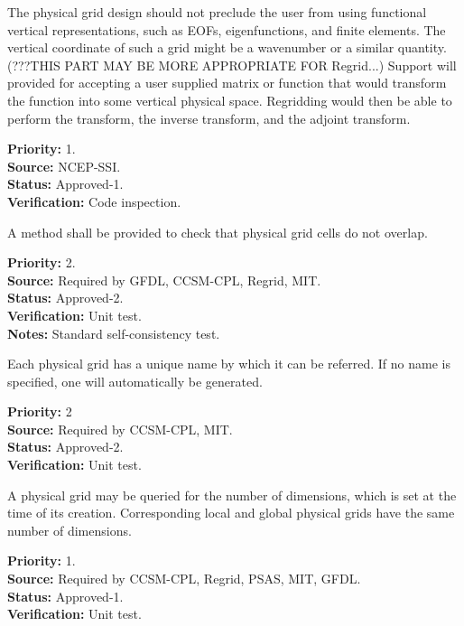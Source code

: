 The physical grid design should not preclude the user from using 
functional vertical representations, such as EOFs, eigenfunctions,
and finite elements.  The vertical coordinate of such a grid might be a wavenumber
or a similar quantity.
(???THIS PART MAY BE MORE APPROPRIATE FOR Regrid...) Support will provided for
accepting a user supplied matrix or function that would transform the function into some
vertical physical space. Regridding would then be able to perform the transform, the
inverse transform, and the adjoint transform.
\begin{reqlist}
{\bf Priority:} 1. \\
{\bf Source:} NCEP-SSI. \\
{\bf Status:} Approved-1. \\
{\bf Verification:} Code inspection.
\end{reqlist}

A method shall be provided to check that physical grid cells do not overlap. 
\begin{reqlist}
{\bf Priority:} 2. \\
{\bf Source:} Required by GFDL, CCSM-CPL, Regrid, MIT. \\
{\bf Status:} Approved-2. \\
{\bf Verification:} Unit test.\\
{\bf Notes:} Standard self-consistency test.
\end{reqlist}


Each physical grid has a unique name by which it can be referred.  If no name is
specified, one will automatically be generated.
\begin{reqlist}
{\bf Priority:} 2 \\
{\bf Source:} Required by CCSM-CPL, MIT. \\
{\bf Status:} Approved-2. \\
{\bf Verification:} Unit test.
\end{reqlist}

A physical grid may be queried for the number of dimensions, which is
set at the time of its creation.  Corresponding local and global physical grids have
the same number of dimensions.
\begin{reqlist}
{\bf Priority:} 1. \\
{\bf Source:} Required by CCSM-CPL, Regrid, PSAS, MIT, GFDL.  \\
{\bf Status:} Approved-1. \\
{\bf Verification:} Unit test.
\end{reqlist}

